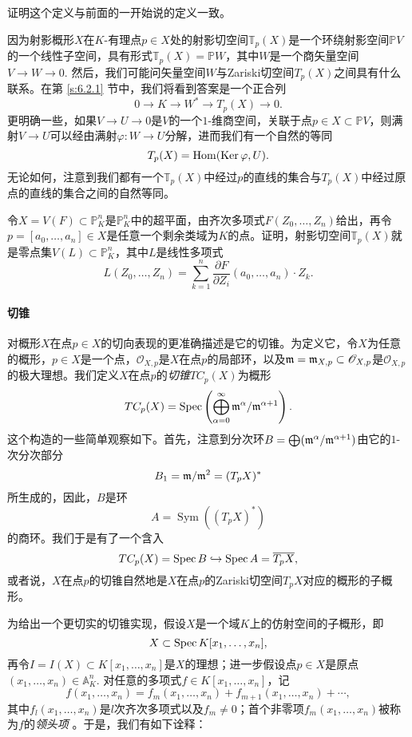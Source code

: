 \begin{exe}\label{exe:3.27}
	证明这个定义与前面的一开始说的\naive 定义一致。
\end{exe}

因为射影概形$X$在$K$-有理点$p\in X$处的射影切空间$\mathbb T_p(X)$是一个环绕射影空间$\mathbb PV$的一个线性子空间，具有形式$\mathbb T_p(X)=\mathbb PW$，其中$W$是一个商矢量空间$V\to W\to 0$. 然后，我们可能问矢量空间$W$与Zariski切空间$T_p(X)$之间具有什么联系。在第 \ref{s:6.2.1} 节中，我们将看到答案是一个正合列
\[
	0\longrightarrow K\longrightarrow W^* \longrightarrow T_p(X)\longrightarrow 0.
\]
更明确一些，如果$V\to U\to 0$是$V$的一个$1$-维商空间，关联于点$p\in X\subset \mathbb PV$，则满射$V\to U$可以经由满射$\varphi:W\to U$分解，进而我们有一个自然的等同
\[
	T_p(X)=\operatorname{Hom}(\operatorname{Ker}\varphi,U).
\]
无论如何，注意到我们都有一个$\mathbb T_p(X)$中经过$p$的直线的集合与$T_p(X)$中经过原点的直线的集合之间的自然等同。

\begin{exe}\label{exe:3.28}
	令$X=V(F)\subset \mathbb P_K^n$是$\mathbb P_K^n$中的超平面，由齐次多项式$F(Z_0,\dots,Z_n)$给出，再令$p=[a_0,\dots,a_n]\in X$是任意一个剩余类域为$K$的点。证明，射影切空间$\mathbb T_p(X)$就是零点集$V(L)\subset \mathbb P_K^n$，其中$L$是线性多项式
	\[
		L(Z_0,\dots,Z_n)=\sum_{k=1}^n\frac{\partial F}{\partial Z_i}(a_0,\dots,a_n)\cdot Z_k.
	\]
\end{exe}

\paragraph*{切锥}
对概形$X$在点$p\in X$的切向表现的更准确描述是它的切锥。为定义它，令$X$为任意的概形，$p\in X$是一个点，$\mathscr O_{X,p}$是$X$在点$p$的局部环，以及$\mathfrak{m}=\mathfrak{m}_{X,p}\subset \mathscr O_{X,p}$是$\mathscr O_{X,p}$的极大理想。我们定义$X$在点$p$的\textit{切锥}$TC_p(X)$为概形
\[
	TC_p(X)=\operatorname{Spec} \left(\bigoplus_{\alpha=0}^\infty \mathfrak{m}^\alpha/\mathfrak{m}^{\alpha+1}\right).
\]
这个构造的一些简单观察如下。首先，注意到分次环$B=\bigoplus (\mathfrak{m}^\alpha/\mathfrak{m}^{\alpha+1})$由它的$1$-次分次部分
\[
	B_1=\mathfrak{m}/\mathfrak{m}^2=(T_pX)^*
\]
所生成的，因此，$B$是环
\[
	A=\operatorname{Sym}((T_pX)^*)
\]
的商环。我们于是有了一个含入
\[
	TC_p(X)=\operatorname{Spec} B\hookrightarrow \operatorname{Spec} A=\overline{T_pX},
\]
或者说，$X$在点$p$的切锥自然地是$X$在点$p$的Zariski切空间$T_pX$对应的概形的子概形。

为给出一个更切实的切锥实现，假设$X$是一个域$K$上的仿射空间的子概形，即
\[
	X\subset \operatorname{Spec} K[x_1,\dots,x_n],
\]
再令$I=I(X)\subset K[x_1,\dots,x_n]$是$X$的理想；进一步假设点$p\in X$是原点$(x_1,\dots,x_n)\in \mathbb A_K^n$. 对任意的多项式$f\in K[x_1,\dots,x_n]$，记
\[
	f(x_1,\dots,x_n)=f_m(x_1,\dots,x_n)+f_{m+1}(x_1,\dots,x_n)+\cdots,
\]
其中$f_l(x_1,\dots,x_n)$是$l$次齐次多项式以及$f_m\neq 0$；首个非零项$f_m(x_1,\dots,x_n)$被称为$f$的\textit{领头项}%
。于是，我们有如下诠释：

